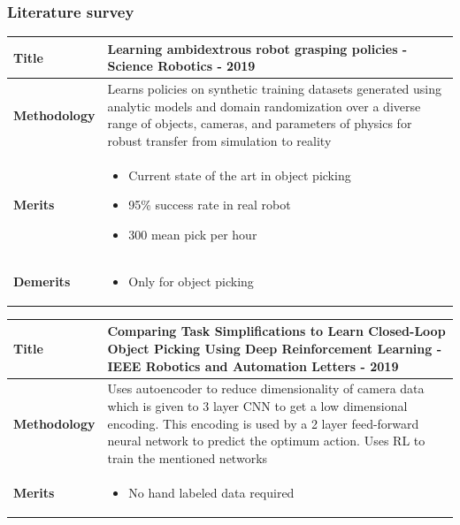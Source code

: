 \documentclass{beamer}
\begin{document}
	\begin{frame}[allowframebreaks]
		\frametitle{Literature survey}
		
		\begin{tabular}{m{2.25cm} | m{9cm}}
			\hline
			
			\textbf{Title} &
			Learning ambidextrous robot grasping policies \cite{dexnet4} - Science Robotics - 2019 \\
			\hline
			
			\textbf{Methodology} &
			Learns policies on synthetic training datasets generated using analytic models and domain randomization over a diverse range of objects, cameras, and parameters of physics for robust transfer from simulation to reality \\
			\hline
			
			\textbf{Merits} &
			\begin{itemize}
				\item Current state of the art in object picking
				\item 95\% success rate in real robot
				\item 300 mean pick per hour
			\end{itemize} \\
			\hline
		
			\textbf{Demerits} &
			\begin{itemize}
				\item Only for object picking
			\end{itemize}\\
			\hline
			
		\end{tabular}
	
		\begin{tabular}{m{2.25cm} | m{9cm}}
			\hline
			
			\textbf{Title} &
			Comparing Task Simplifications to Learn Closed-Loop Object Picking Using Deep Reinforcement Learning \cite{tasksimplification} - IEEE Robotics and Automation Letters - 2019\\
			\hline
			
			\textbf{Methodology} &
			Uses autoencoder to reduce dimensionality of camera data which is given to 3 layer CNN to get a low dimensional encoding. This encoding is used by a 2 layer feed-forward neural network to predict the optimum action. Uses RL to train the mentioned networks\\
			\hline
			
			\textbf{Merits} &
			\begin{itemize}
				\item No hand labeled data required
			\end{itemize} \\
			\hline
			

\end{tabular}
\end{frame}
\end{document}
